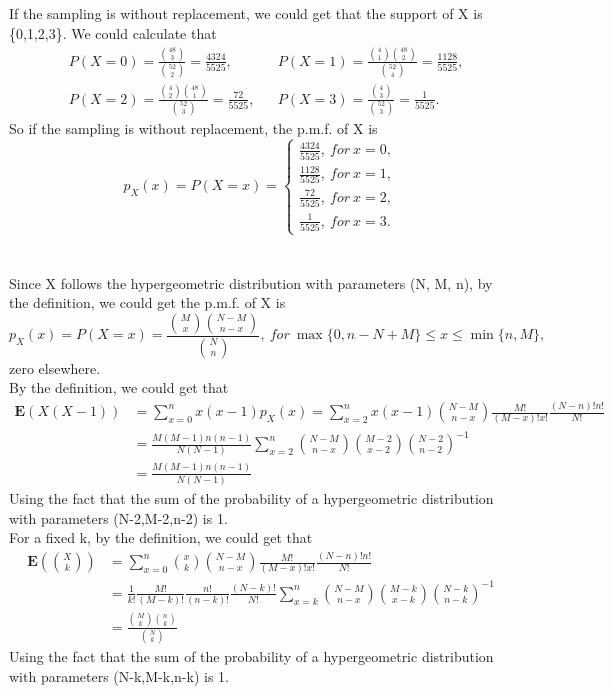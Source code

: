 \documentclass[10.5pt]{article}
\begin{document}
\subsection{}
If the sampling is without replacement, we could get that the support of X is \{0,1,2,3\}. We could calculate that $$\begin{aligned}
    &P(X=0)=\frac{\binom{48}{3}}{\binom{52}{2}}=\frac{4324}{5525},& &P(X=1)=\frac{\binom{4}{1}\binom{48}{2}}{\binom{52}{4}}=\frac{1128}{5525},\\
    &P(X=2)=\frac{\binom{4}{2}\binom{48}{1}}{\binom{52}{3}}=\frac{72}{5525},& &P(X=3)=\frac{\binom{4}{3}}{\binom{52}{3}}=\frac{1}{5525}.
\end{aligned}$$\indent
So if the sampling is without replacement, the p.m.f. of X is $$p_X(x)=P(X=x)=\begin{cases}
    \frac{4324}{5525},~for~x=0,\\
    \frac{1128}{5525},~for~x=1,\\
    \frac{72}{5525},~for~x=2,\\
    \frac{1}{5525},~for~x=3.
\end{cases}$$

\section{}
Since X follows the hypergeometric distribution with parameters (N, M, n), by the definition, we could get the p.m.f. of X is $$p_X(x)=P(X=x)=\frac{\binom{M}{x}\binom{N-M}{n-x}}{\binom{N}{n}},~for~\max\{0,n-N+M\}\leqslant x\leqslant\min\{n,M\},$$\indent
zero elsewhere.\\\indent
By the definition, we could get that $$\begin{aligned}
    \mathbf{E}(X(X-1))&=\sum_{x=0}^nx(x-1)p_X(x)=\sum_{x=2}^n x(x-1)\binom{N-M}{n-x}\frac{M!}{(M-x)!x!}\frac{(N-n)!n!}{N!}\\
    &=\frac{M(M-1)n(n-1)}{N(N-1)}\sum_{x=2}^n\binom{N-M}{n-x}\binom{M-2}{x-2}\binom{N-2}{n-2}^{-1}\\
    &=\frac{M(M-1)n(n-1)}{N(N-1)}
\end{aligned}$$\indent
Using the fact that the sum of the probability of a hypergeometric distribution with parameters (N-2,M-2,n-2) is 1.\\\indent
For a fixed k, by the definition, we could get that $$\begin{aligned}
    \mathbf{E}\left(\binom{X}{k}\right)&=\sum_{x=0}^n \binom{x}{k}\binom{N-M}{n-x}\frac{M!}{(M-x)!x!}\frac{(N-n)!n!}{N!}\\
    &=\frac{1}{k!}\frac{M!}{(M-k)!}\frac{n!}{(n-k)!}\frac{(N-k)!}{N!}\sum_{x=k}^n\binom{N-M}{n-x}\binom{M-k}{x-k}\binom{N-k}{n-k}^{-1}\\
    &=\frac{\binom{M}{k}\binom{n}{k}}{\binom{N}{k}}
\end{aligned}$$\indent
Using the fact that the sum of the probability of a hypergeometric distribution with parameters (N-k,M-k,n-k) is 1.
\end{document}
